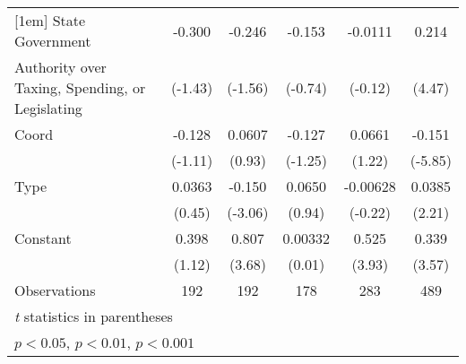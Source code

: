 {\begin{tabular}{l*{5}{c}}
[1em]
State Government    &      -0.300         &      -0.246         &      -0.153         &     -0.0111         &       0.214\sym{***}\\
Authority over Taxing, Spending, or Legislating&     (-1.43)         &     (-1.56)         &     (-0.74)         &     (-0.12)         &      (4.47)         \\
[1em]
Coord               &      -0.128         &      0.0607         &      -0.127         &      0.0661         &      -0.151\sym{***}\\
                    &     (-1.11)         &      (0.93)         &     (-1.25)         &      (1.22)         &     (-5.85)         \\
[1em]
Type                &      0.0363         &      -0.150\sym{**} &      0.0650         &    -0.00628         &      0.0385\sym{*}  \\
                    &      (0.45)         &     (-3.06)         &      (0.94)         &     (-0.22)         &      (2.21)         \\
[1em]
Constant            &       0.398         &       0.807\sym{***}&     0.00332         &       0.525\sym{***}&       0.339\sym{***}\\
                    &      (1.12)         &      (3.68)         &      (0.01)         &      (3.93)         &      (3.57)         \\
\hline
Observations        &         192         &         192         &         178         &         283         &         489         \\
\hline\hline
\multicolumn{6}{l}{\footnotesize \textit{t} statistics in parentheses}\\
\multicolumn{6}{l}{\footnotesize \sym{*} \(p<0.05\), \sym{**} \(p<0.01\), \sym{***} \(p<0.001\)}\\
\end{tabular}
}
